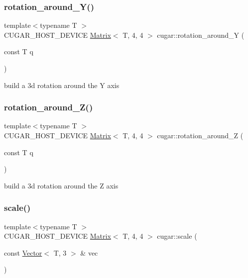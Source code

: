 \subsubsection{\texorpdfstring{rotation\+\_\+around\+\_\+\+Y()}{rotation\_around\_Y()}}
{\footnotesize\ttfamily template$<$typename T $>$ \\
C\+U\+G\+A\+R\+\_\+\+H\+O\+S\+T\+\_\+\+D\+E\+V\+I\+CE \hyperlink{structcugar_1_1_matrix}{Matrix}$<$ T, 4, 4 $>$ cugar\+::rotation\+\_\+around\+\_\+Y (\begin{DoxyParamCaption}\item[{const T}]{q }\end{DoxyParamCaption})}

build a 3d rotation around the Y axis \mbox{\label{group___matrices_module_ga51992445e107a4f8fcc79ce8c52a2fdd}} 
\subsubsection{\texorpdfstring{rotation\+\_\+around\+\_\+\+Z()}{rotation\_around\_Z()}}
{\footnotesize\ttfamily template$<$typename T $>$ \\
C\+U\+G\+A\+R\+\_\+\+H\+O\+S\+T\+\_\+\+D\+E\+V\+I\+CE \hyperlink{structcugar_1_1_matrix}{Matrix}$<$ T, 4, 4 $>$ cugar\+::rotation\+\_\+around\+\_\+Z (\begin{DoxyParamCaption}\item[{const T}]{q }\end{DoxyParamCaption})}

build a 3d rotation around the Z axis \mbox{\label{group___matrices_module_ga44968c79fbae587c1dfff598307b623e}} 
\subsubsection{\texorpdfstring{scale()}{scale()}}
{\footnotesize\ttfamily template$<$typename T $>$ \\
C\+U\+G\+A\+R\+\_\+\+H\+O\+S\+T\+\_\+\+D\+E\+V\+I\+CE \hyperlink{structcugar_1_1_matrix}{Matrix}$<$ T, 4, 4 $>$ cugar\+::scale (\begin{DoxyParamCaption}\item[{const \hyperlink{structcugar_1_1_vector}{Vector}$<$ T, 3 $>$ \&}]{vec }\end{DoxyParamCaption})}



